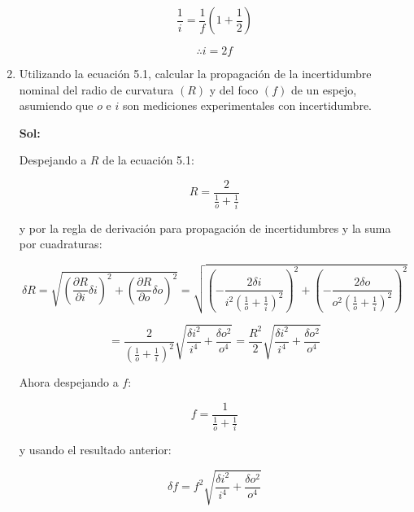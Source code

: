 \documentclass[12pt,a4paper]{article}
\begin{document}
\begin{enumerate}
\begin{equation*}
    \frac{1}{i } = \frac{1}{f} \left(1 + \frac{1}{2} \right)
\end{equation*}

\begin{equation*}
    \therefore i = 2f
\end{equation*}








\item Utilizando la ecuación 5.1, calcular la propagación de la incertidumbre nominal del radio de curvatura $(R)$ y del foco $(f)$ de un espejo, asumiendo que $o$ e $i$ son mediciones experimentales con incertidumbre.

\textbf{Sol:}

Despejando a $R$ de la ecuación 5.1:

\begin{equation*}
    R = \frac{2}{\frac{1}{o} + \frac{1}{i}}
\end{equation*}

y por la regla de derivación para propagación de incertidumbres y la suma por cuadraturas:

\begin{equation*}
    \delta R = \sqrt{\left(\frac{\partial R}{\partial i}\delta i\right)^2 + \left(\frac{\partial R}{\partial o}\delta o\right)^2} = \sqrt{\left(-\frac{2 \delta i}{i^2\left(\frac{1}{o} + \frac{1}{i}\right)^2}\right)^2 + \left(-\frac{2 \delta o}{o^2\left(\frac{1}{o} + \frac{1}{i}\right)^2}\right)^2} 
\end{equation*}

\begin{equation*}
    = \frac{2}{\left(\frac{1}{o} + \frac{1}{i}\right)^2} \sqrt{\frac{\delta i ^2}{i^4} + \frac{\delta o^2}{o^4}} = \frac{R^2}{2} \sqrt{\frac{\delta i^2}{i^4} + \frac{\delta o^2}{o^4}}
\end{equation*}

Ahora despejando a $f$:

\begin{equation*}
    f = \frac{1}{\frac{1}{o} + \frac{1}{i}}
\end{equation*}

y usando el resultado anterior:


\begin{equation*}
     \delta f=  f^2 \sqrt{\frac{\delta i^2}{i^4} + \frac{\delta o^2}{o^4}}
\end{equation*}





\end{enumerate}
\end{document}
